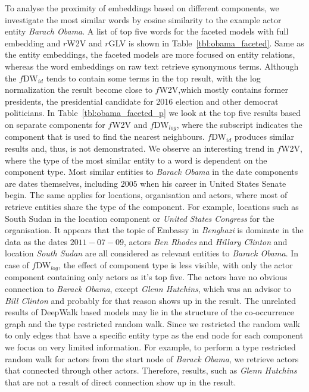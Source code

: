 To analyse the proximity of embeddings based on different components, we investigate the most similar words by cosine similarity to the example actor entity \emph{Barach Obama}. A list of top five words for the faceted models with full embedding and $r$W2V and $r$GLV is shown in Table~\ref{tbl:obama_faceted}. Same as the entity embeddings, the faceted models are more focused on entity relations, whereas the word embeddings on raw text retrieve synonymous terms. Although the $f$DW$_{id}$ tends to contain some terms in the top result, with the log normalization the result become close to $f$W2V,which mostly contains former presidents, the presidential candidate for 2016 election and other democrat politicians. In Table~\ref{tbl:obama_faceted_p} we look at the top five results based on separate components for $f$W2V and $f$DW$_{log}$, where the subscript indicates the component that is used to find the nearest neighbours. $f$DW$_{id}$ produces similar results and, thus, is not demonstrated. We observe an interesting trend in $f$W2V, where the type of the most similar entity to a word is dependent on the component type. Most similar entities to \emph{Barack Obama} in the date components are dates themselves, including $2005$ when his career in United States Senate begin. The same applies for locations, organisation and actors, where most of retrieve entities share the type of the component. For example, locations such as South Sudan in the location component or  \emph{United States Congress} for the organisation. It appears that the topic of Embassy in  \emph{Benghazi} is dominate in the data as the dates $2011-07-09$, actors  \emph{Ben Rhodes} and  \emph{Hillary Clinton} and location  \emph{South Sudan} are all considered as relevant entities to \emph{Barack Obama}. In case of $f$DW$_{log}$, the effect of component type is less visible, with only the actor component containing only actors as it's top five. The actors have no obvious connection to \emph{Barack Obama}, except \emph{Glenn Hutchins}, which was an advisor to \emph{Bill Clinton} and probably for that reason shows up in the result. The unrelated results of DeepWalk based models may lie in the structure of the co-occurrence graph and the type restricted random walk. Since we restricted the random walk to only edges that have a specific entity type as the end node for each component we focus on very limited information. For example, to perform a type restricted random walk for actors from the start node of  \emph{Barack Obama}, we retrieve actors that connected through other actors. Therefore, results, such as \emph{Glenn Hutchins} that are not a result of direct connection show up in the result.

